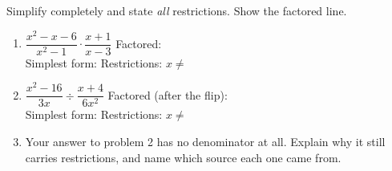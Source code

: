 \documentclass[10pt]{article}
\begin{document}
\begin{practicebox}
Simplify completely and state \emph{all} restrictions. Show the factored line.

\vspace{3pt}
\begin{enumerate}[leftmargin=1.7em, itemsep=8pt]
  \item $\dfrac{x^2-x-6}{x^2-1}\cdot\dfrac{x+1}{x-3}$ \hfill Factored:  \\[4pt]
        Simplest form:  \quad Restrictions: $x\neq$ 
  \item $\dfrac{x^2-16}{3x}\div\dfrac{x+4}{6x^2}$ \hfill Factored (after the flip):  \\[4pt]
        Simplest form:  \quad Restrictions: $x\neq$ 
  \item Your answer to problem 2 has no denominator at all. Explain why it still carries restrictions,
        and name which source each one came from.
\end{enumerate}
\end{practicebox}
\end{document}
